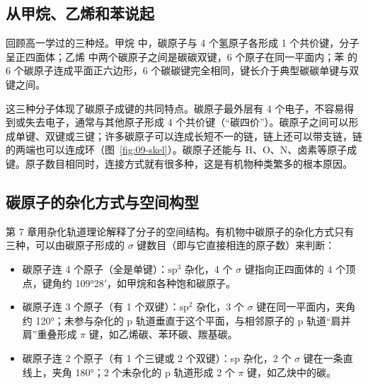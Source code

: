 \subsection{从甲烷、乙烯和苯说起}
回顾高一学过的三种烃。甲烷  中，碳原子与 4 个氢原子各形成 1 个共价键，分子呈正四面体；乙烯  中两个碳原子之间是碳碳双键，6 个原子在同一平面内；苯  的 6 个碳原子连成平面正六边形，6 个碳碳键完全相同，键长介于典型碳碳单键与双键之间。

这三种分子体现了碳原子成键的共同特点。碳原子最外层有 4 个电子，不容易得到或失去电子，通常与其他原子形成 4 个共价键（“碳四价”）。碳原子之间可以形成单键、双键或三键；许多碳原子可以连成长短不一的链，链上还可以带支链，链的两端也可以连成环（图~\ref{fig:09-skel}）。碳原子还能与 H、O、N、卤素等原子成键。原子数目相同时，连接方式就有很多种，这是有机物种类繁多的根本原因。


\subsection{碳原子的杂化方式与空间构型}
第 7 章用杂化轨道理论解释了分子的空间结构。有机物中碳原子的杂化方式只有三种，可以由碳原子形成的 $\sigma$ 键数目（即与它直接相连的原子数）来判断：
\begin{itemize}
\item 碳原子连 4 个原子（全是单键）：$\mathrm{sp}^3$ 杂化，4 个 $\sigma$ 键指向正四面体的 4 个顶点，键角约 109°28$'$，如甲烷和各种饱和碳原子。
\item 碳原子连 3 个原子（有 1 个双键）：$\mathrm{sp}^2$ 杂化，3 个 $\sigma$ 键在同一平面内，夹角约 120°；未参与杂化的 p 轨道垂直于这个平面，与相邻原子的 p 轨道“肩并肩”重叠形成 $\pi$ 键，如乙烯碳、苯环碳、羰基碳。
\item 碳原子连 2 个原子（有 1 个三键或 2 个双键）：sp 杂化，2 个 $\sigma$ 键在一条直线上，夹角 180°；2 个未杂化的 p 轨道形成 2 个 $\pi$ 键，如乙炔中的碳。
\end{itemize}

